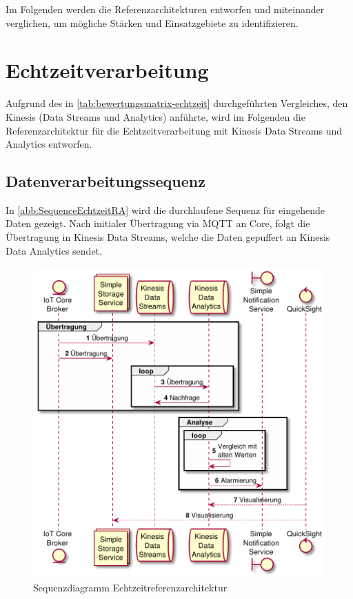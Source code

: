 
Im Folgenden werden die Referenzarchitekturen entworfen und miteinander verglichen, um mögliche Stärken und Einsatzgebiete zu identifizieren.

\section{Echtzeitverarbeitung}
Aufgrund des in \autoref{tab:bewertungsmatrix-echtzeit} durchgeführten Vergleiches, den Kinesis (Data Streams und Analytics) anführte, wird im Folgenden die Referenzarchitektur für die Echtzeitverarbeitung mit Kinesis Data Streams und Analytics entworfen. 

\subsection{Datenverarbeitungssequenz}
In \autoref{abb:SequenceEchtzeitRA} wird die durchlaufene Sequenz für eingehende Daten gezeigt. Nach initialer Übertragung via \ac{MQTT} an \AWSIOT{} Core, folgt die Übertragung in Kinesis Data Streams, welche die Daten gepuffert an Kinesis Data Analytics sendet. 

\begin{figure}[H]
\centering
\includegraphics[height=0.66\textheight]{graphics/echtzeit-ra.pdf}
\caption{Sequenzdiagramm Echtzeitreferenzarchitektur}
\label{abb:SequenceEchtzeitRA}
\end{figure}

